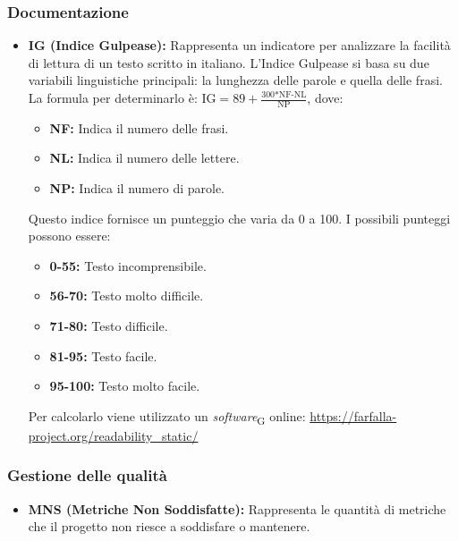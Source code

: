 \subsubsection{Documentazione}
\begin{itemize}
    \item \textbf{IG (Indice Gulpease):} Rappresenta un indicatore per analizzare la facilità di lettura di un testo scritto in italiano. L’Indice Gulpease si basa su due variabili linguistiche principali: la lunghezza delle parole e quella delle frasi. \\
    La formula per determinarlo è: \( \text{IG} = 89+\frac{\text{300*NF-NL}}{\text{NP}} \), dove:
    \begin{itemize}
        \item \textbf{NF:} Indica il numero delle frasi.
        \item \textbf{NL:} Indica il numero delle lettere.
        \item \textbf{NP:} Indica il numero di parole.
    \end{itemize}
    Questo indice fornisce un punteggio che varia da 0 a 100. I possibili punteggi possono essere:
    \begin{itemize}
        \item \textbf{0-55:} Testo incomprensibile.
        \item \textbf{56-70:} Testo molto difficile.
        \item \textbf{71-80:} Testo difficile.
        \item \textbf{81-95:} Testo facile.
        \item \textbf{95-100:} Testo molto facile.
    \end{itemize}
    Per calcolarlo viene utilizzato un \textit{software}\textsubscript{G} online: \url{https://farfalla-project.org/readability_static/}
\end{itemize}
\subsubsection{Gestione delle qualità}
\begin{itemize}
    \item \textbf{MNS (Metriche Non Soddisfatte):} Rappresenta le quantità di metriche che il progetto non riesce a soddisfare o mantenere.
\end{itemize}

